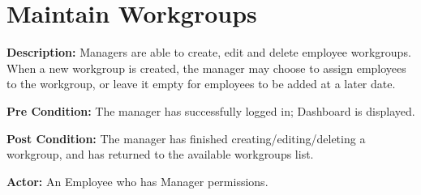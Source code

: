 \documentclass[letterpaper,12pt]{report}
\begin{document}
\section{Maintain Workgroups}
\begin{description}
 \item \textbf{Description:} \newline Managers are able to create, edit and delete employee workgroups.  When a new workgroup is created, the manager may choose to assign employees to the workgroup, or leave it empty for employees to be added at a later date.
 \item \textbf{Pre Condition:} \newline  The manager has successfully logged in; Dashboard is displayed.
 \item \textbf{Post Condition:} \newline The manager has finished creating/editing/deleting a workgroup, and has returned to the available workgroups list.
 \item \textbf{Actor:} \newline An Employee who has Manager permissions.
\end{description}
\end{document}
